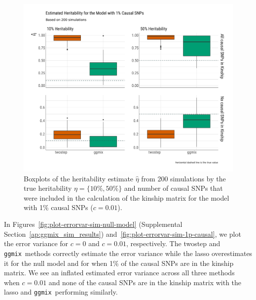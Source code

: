 \documentclass[12pt,letter]{article}\usepackage[]{graphicx}\usepackage[]{color}
\newenvironment{knitrout}{}{} %
\newcommand{\ggmix}{\texttt{ggmix}}
\begin{document}
\begin{knitrout}\scriptsize
{}\color{fgcolor}\begin{figure}[H]

{\centering \includegraphics[width=1\linewidth]{figure/plot-eta-sim-1p-causal-1} 

}

\caption[Boxplots of the heritability estimate $\hat{\eta}$ from 200 simulations by the true heritability $\eta = \lbrace 10\%, 50\% \rbrace$ and number of causal SNPs that were included in the calculation of the kinship matrix for the model with 1\% causal SNPs ($c=0.01$)]{Boxplots of the heritability estimate $\hat{\eta}$ from 200 simulations by the true heritability $\eta = \lbrace 10\%, 50\% \rbrace$ and number of causal SNPs that were included in the calculation of the kinship matrix for the model with 1\% causal SNPs ($c=0.01$).}\label{fig:plot-eta-sim-1p-causal}
\end{figure}


\end{knitrout}


In Figures~\ref{fig:plot-errorvar-sim-null-model} (Supplemental Section~\ref{ap:ggmix_sim_results}) and~\ref{fig:plot-errorvar-sim-1p-causal}, we plot the error variance for $c=0$ and $c=0.01$, respectively.
The twostep and \ggmix ~methods correctly estimate the error variance while the lasso overestimates it for the null model and for when 1\% of the causal SNPs are in the kinship matrix. We see an inflated estimated error variance across all three methods when $c=0.01$ and none of the causal SNPs are in the kinship matrix with the lasso and \ggmix ~performing similarly.
\end{document}
